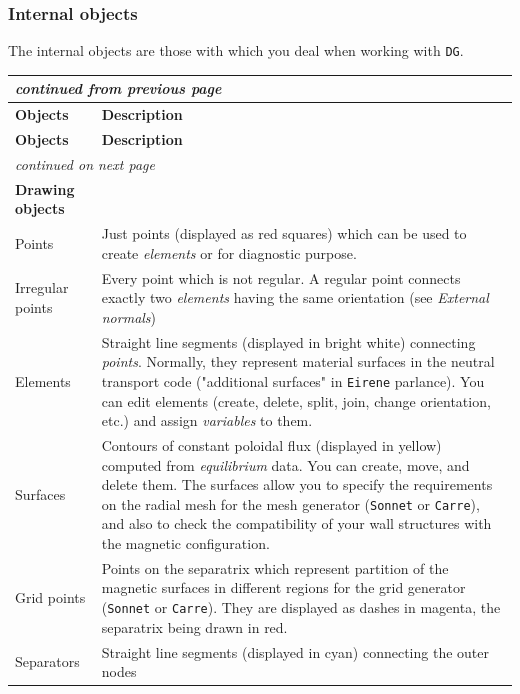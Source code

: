 \documentclass[a4paper,10pt]{report}
\begin{document}
\subsubsection{Internal objects}
\label{sec:internalobjects}

The internal objects are those with which you deal when working with {\tt DG}.

\begin{center}
    \begin{longtable}{|l|p{12cm}|}
    \hline
    \multicolumn{2}{|l|}{\small\sl continued from previous page} \\
    \hline {\large\bf Objects} & {\large\bf Description} \\
    \hline \endhead
    \hline {\large\bf Objects} & {\large\bf Description} \\
    \hline \endfirsthead
    \hline
    \multicolumn{2}{|l|}{\small\sl continued on next page} \\
    \hline \endfoot
    \endlastfoot
{\bf Drawing objects}&             \\
Points               &
Just points (displayed as red squares) which can be used to create
{\it elements} or for diagnostic purpose.
\\
Irregular points
&
Every point which is not regular. A regular point connects
exactly two {\it elements} having the same orientation (see
{\it External normals})
\\
Elements
&
Straight line segments (displayed in bright white) connecting
{\it points}. Normally, they represent material surfaces
in the neutral transport code ("additional surfaces"
in {\tt Eirene} parlance). You can edit elements (create,
delete, split, join, change orientation, etc.) and assign
{\it variables} to them.
\\
Surfaces
&
Contours of constant poloidal flux
(displayed
in yellow) computed from {\it equilibrium} data. You can create,
move, and delete them. The surfaces allow you to specify the
requirements on the radial mesh for the mesh generator
({\tt Sonnet} or {\tt Carre}), and also to
check the compatibility of your wall structures with the magnetic
configuration.
\\
Grid points
&
Points on the separatrix which represent partition of the magnetic
surfaces in different regions for the grid generator
({\tt Sonnet} or {\tt Carre}). They are
displayed as dashes in magenta, the separatrix being drawn in red.
\\
Separators
&
Straight line segments (displayed in cyan) connecting the outer nodes

\end{longtable}
\end{center}
\end{document}
